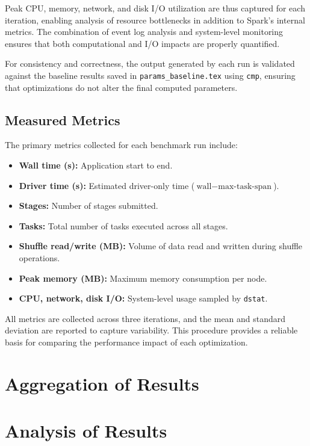 \documentclass[conference,a4paper]{IEEEtran}
\begin{document}
Peak CPU, memory, network, and disk I/O utilization are thus captured for each
iteration, enabling analysis of resource bottlenecks in addition to Spark's
internal metrics. The combination of event log analysis and system-level
monitoring ensures that both computational and I/O impacts are properly
quantified.

For consistency and correctness, the output generated by each run is validated
against the baseline results saved in \texttt{params\_baseline.tex} using
\texttt{cmp}, ensuring that optimizations do not alter the final computed
parameters.

\subsection*{Measured Metrics}
\label{sec:metrics}

The primary metrics collected for each benchmark run include:
\begin{itemize}
    \item \textbf{Wall time (s):} Application start to end.
    \item \textbf{Driver time (s):} Estimated driver-only time ($\text{wall} - \text{max-task-span}$).
    \item \textbf{Stages:} Number of stages submitted.
    \item \textbf{Tasks:} Total number of tasks executed across all stages.
    \item \textbf{Shuffle read/write (MB):} Volume of data read and written during
          shuffle operations.
    \item \textbf{Peak memory (MB):} Maximum memory consumption per node.
    \item \textbf{CPU, network, disk I/O:} System-level usage sampled by \texttt{dstat}.
\end{itemize}

All metrics are collected across three iterations, and the mean and standard
deviation are reported to capture variability. This procedure provides a
reliable basis for comparing the performance impact of each optimization.

\section{Aggregation of Results}
\label{sec:aggregation_results}


\section{Analysis of Results}
\label{sec:analysis_results}
\end{document}
